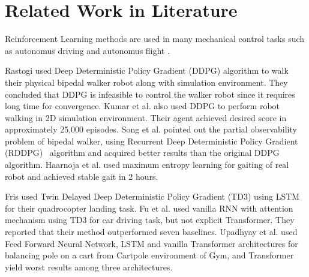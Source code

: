 \section{Related Work in Literature}
\label{sec:related_work}

Reinforcement Learning methods are used in many mechanical control tasks 
such as autonomus driving \cite{pan_virtual_2017, shalev-shwartz_safe_2016, sallab_deep_2017, wang_deep_2019} 
and autonomus flight \cite{kopsa_reinforcement_2018, abbeel_application_2006, santos_experimental_2012}.

Rastogi \cite{rastogi_deep_2017} used Deep Deterministic Policy Gradient (DDPG) algorithm to walk 
their physical bipedal walker robot along with simulation environment. 
They concluded that DDPG is infeasible to control the walker robot 
since it requires long time for convergence. 
Kumar et al. \cite{kumar_bipedal_2018} also used DDPG to perform 
robot walking in 2D simulation environment. 
Their agent achieved desired score in approximately 25,000 episodes. 
Song et al. \cite{song_recurrent_2018} pointed out the partial observability problem of bipedal walker, 
using Recurrent Deep Deterministic Policy Gradient (RDDPG)~\cite{heess_memory-based_2015} algorithm 
and acquired better results than the original DDPG algorithm. 
Haarnoja et al. \cite{haarnoja_learning_2019} used maximum entropy learning for gaiting of real robot and achieved stable gait in 2 hours. 

Fris \cite{fris_landing_2020} used Twin Delayed Deep Deterministic Policy Gradient (TD3) 
using LSTM for their quadrocopter landing task. 
Fu et al. \cite{fu_when_2020} used vanilla RNN with attention mechanism 
using TD3 for car driving task, but not explicit Transformer. 
They reported that their method outperformed seven baselines. 
Upadhyay et al. \cite{upadhyay_transformer_2019} used Feed Forward Neural Network, 
LSTM and vanilla Transformer architectures for balancing pole 
on a cart from Cartpole environment of Gym, and Transformer yield worst results among three architectures.
